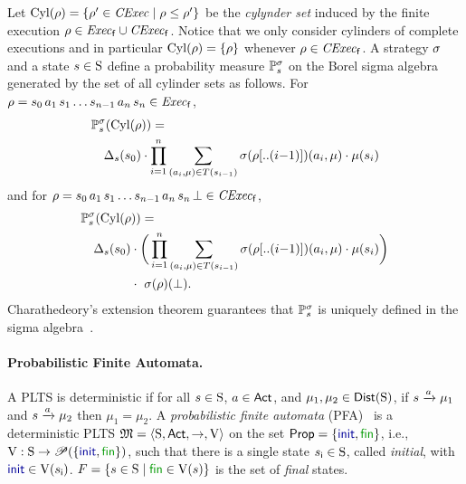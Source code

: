 Let $\Cyl(\rho)=\{\rho'\in\cexec\mid{\rho\leq\rho'}\}$ be the
\emph{cylynder set} induced by the finite execution
$\rho\in\execf\cup\cexecf$.  Notice that we only consider cylinders of
complete executions and in particular $\Cyl(\rho)=\{\rho\}$ whenever
$\rho\in\cexecf$.
%
A strategy $\strat$ and a state $s\in\S$ define a probability
measure $\Prob^\strat_s$ on the Borel sigma algebra generated by the
set of all cylinder sets as follows.
%
For $\rho = s_0\, a_1\, s_1\ldots s_{n-1}\, a_n\, s_n \in \execf$,
%
\begin{align}
  &\Prob^\strat_s(\Cyl(\rho)) = {}\label{eq:def:prob:i}\\
  &\quad \Dirac_s(s_0)\cdot\prod\limits_{i=1}^n\sum\limits_{(a_i,\mu)\in T(s_{i-1})}\strat(\rho[..(i{-}1)])(a_i,\mu)\cdot\mu(s_i)\notag
\end{align}
%
and for
$\rho = s_0\, a_1\, s_1\ldots s_{n-1}\, a_n\, s_n\, \complete \in \cexecf$,
%
\begin{align}
  &\Prob^\strat_s(\Cyl(\rho)) = {}\label{eq:def:prob:ii}\\
  &\quad \Dirac_s(s_0)\cdot\bigg(\prod\limits_{i=1}^n\sum\limits_{(a_i,\mu)\in T(s_{i-1})}\strat(\rho[..(i{-}1)])(a_i,\mu)\cdot\mu(s_i)\bigg)\notag\\
  &\phantom{\quad \Dirac_s(s_0)} \cdot \ \strat(\rho)(\complete).\notag
\end{align}
%
Charathedeory's extension theorem guarantees that $\Prob^\strat_s$ is
uniquely defined in the sigma algebra~\cite{Segala95}.




\paragraph{Probabilistic Finite Automata.} A PLTS is deterministic if for all $s\in\S$, $a\in\Act$, and
$\mu_1,\mu_2\in\Dist(\S)$, if $s\reach{a}\mu_1$ and $s\reach{a}\mu_2$
then $\mu_1=\mu_2$.
%
A \emph{probabilistic finite automata} (PFA)~\cite{Rabin63,Paz71} is a
deterministic PLTS $\model=\tup{\S,\Act,\ra,\V}$ on the set
$\Prop=\{\init,\fin\}$, i.e., $\V:\S\to\powerset(\{\init,\fin\})$,
such that there is a single state $\sini\in\S$, called
\emph{initial}, with $\init\in\V(\sini)$.
%
$F=\{{s\in\S}\mid{\fin\in\V(s)}\}$ is the set of \emph{final} states.

